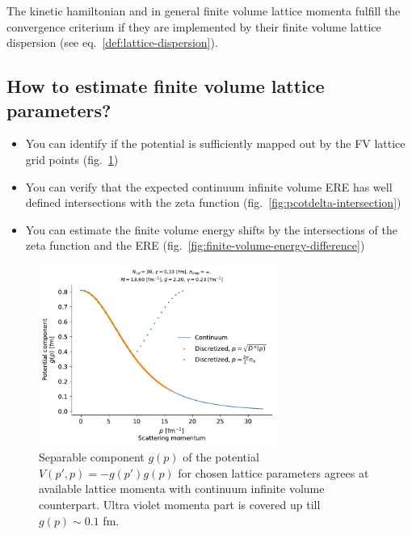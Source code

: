 \documentclass[
    aps,
    prl,
    showkeys,
    nofootinbib,
    floatfix
]{revtex4-1}
\begin{document}
The kinetic hamiltonian and in general finite volume lattice momenta fulfill the convergence criterium if they are implemented by their finite volume lattice dispersion (see eq.~\eqref{def:lattice-dispersion}).

\subsection{How to estimate finite volume lattice parameters?}
\begin{itemize}
	\item You can identify if the potential is sufficiently mapped out by the FV lattice grid points (fig.~\ref{fig:potential-component})
	\item You can verify that the expected continuum infinite volume ERE has well defined intersections with the zeta function (fig.~\ref{fig:pcotdelta-intersection})
	\item You can estimate the finite volume energy shifts by the intersections of the zeta function and the ERE (fig.~\ref{fig:finite-volume-energy-difference})
\end{itemize}

\begin{figure}[!htb]
\includegraphics[width=0.7\textwidth]{figs/potential-component.pdf}
\caption{
	\label{fig:potential-component}
	Separable component $g(p)$ of the potential $V(p', p) = -g(p') g(p)$ for chosen lattice parameters agrees at available lattice momenta with continuum infinite volume counterpart.
	Ultra violet momenta part is covered up till $g(p) \sim 0.1$ fm.
}
\end{figure}
\end{document}
